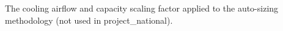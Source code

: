 The cooling airflow and capacity scaling factor applied to the auto-sizing methodology (not used in project\_national).
